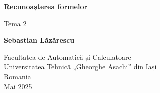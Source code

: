 \documentclass[12pt]{article}
\begin{document}
\begin{titlepage}
    \begin{center}
        \vspace*{1cm}

        \Huge
        \textbf{Recunoașterea formelor}

        \vspace{0.5cm}
        \LARGE
        Tema 2

        \vspace{1.5cm}

        \textbf{Sebastian Lăzărescu}

        \vfill

        \Large
        Facultatea de Automatică și Calculatoare\\
        Universitatea Tehnică „Gheorghe Asachi” din Iași\\
        Romania\\
        Mai 2025
    \end{center}
\end{titlepage}
\end{document}
